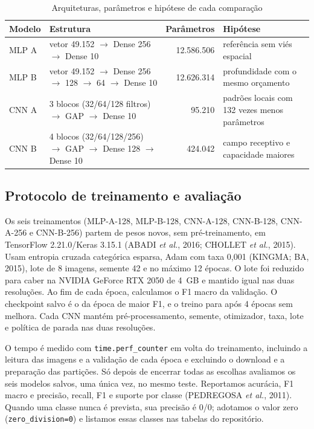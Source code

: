 \documentclass[12pt,a4paper]{article}
\newcommand{\fonte}[1]{\par\vspace{2pt}{\footnotesize Fonte: #1\par}}
\newcommand{\fonteautores}{\fonte{elaborado pelos autores a partir do NWPU-RESISC45 (CHENG; HAN; LU, 2017).}}
\begin{document}
\begin{table}[H]
\centering
\caption{Arquiteturas, parâmetros e hipótese de cada comparação}\label{tab:arq}
\small
\begin{tabularx}{\linewidth}{@{}lp{6.1cm}rX@{}}
\toprule
Modelo & Estrutura & Parâmetros & Hipótese\\
\midrule
MLP A & vetor 49.152 \(\rightarrow\) Dense 256 \(\rightarrow\) Dense 10 & 12.586.506 & referência sem viés espacial\\
MLP B & vetor 49.152 \(\rightarrow\) Dense 256 \(\rightarrow\) 128 \(\rightarrow\) 64 \(\rightarrow\) Dense 10 & 12.626.314 & profundidade com o mesmo orçamento\\
CNN A & 3 blocos (32/64/128 filtros) \(\rightarrow\) GAP \(\rightarrow\) Dense 10 & 95.210 & padrões locais com 132 vezes menos parâmetros\\
CNN B & 4 blocos (32/64/128/256) \(\rightarrow\) GAP \(\rightarrow\) Dense 128 \(\rightarrow\) Dense 10 & 424.042 & campo receptivo e capacidade maiores\\
\bottomrule
\end{tabularx}
\fonteautores
\end{table}

\subsection{Protocolo de treinamento e avaliação}

Os seis treinamentos (MLP-A-128, MLP-B-128, CNN-A-128, CNN-B-128, CNN-A-256 e CNN-B-256) partem de pesos novos, sem pré-treinamento, em TensorFlow 2.21.0/Keras 3.15.1 (ABADI \textit{et al.}, 2016; CHOLLET \textit{et al.}, 2015). Usam entropia cruzada categórica esparsa, Adam com taxa 0,001 (KINGMA; BA, 2015), lote de 8 imagens, semente 42 e no máximo 12 épocas. O lote foi reduzido para caber na NVIDIA GeForce RTX 2050 de 4~GB e mantido igual nas duas resoluções. Ao fim de cada época, calculamos o F1 macro da validação. O checkpoint salvo é o da época de maior F1, e o treino para após 4 épocas sem melhora. Cada CNN mantém pré-processamento, semente, otimizador, taxa, lote e política de parada nas duas resoluções.

O tempo é medido com \texttt{time.perf\_counter} em volta do treinamento, incluindo a leitura das imagens e a validação de cada época e excluindo o download e a preparação das partições. Só depois de encerrar todas as escolhas avaliamos os seis modelos salvos, uma única vez, no mesmo teste. Reportamos acurácia, F1 macro e precisão, recall, F1 e suporte por classe (PEDREGOSA \textit{et al.}, 2011). Quando uma classe nunca é prevista, sua precisão é 0/0; adotamos o valor zero (\texttt{zero\_division=0}) e listamos essas classes nas tabelas do repositório.
\end{document}
